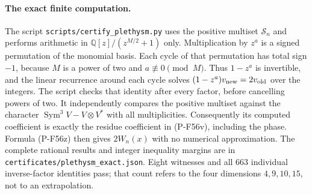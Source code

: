 \paragraph{The exact finite computation.}
The script \texttt{scripts/certify\_plethysm.py} uses the positive
multiset $\mathcal S_n$ and performs arithmetic in
$\mathbb Q[z]/(z^{M/2}+1)$ only.  Multiplication by $z^a$ is a
signed permutation of the monomial basis.  Each cycle of that
permutation has total sign $-1$, because $M$ is a power of two
and $a\not\equiv0\pmod M$.  Thus $1-z^a$ is invertible, and the
linear recurrence around each cycle solves
$(1-z^a)v_{\rm new}=2v_{\rm old}$ over the integers.
The script checks that identity after every factor, before
cancelling powers of two.  It independently compares the positive
multiset against the character
$\operatorname{Sym}^3V-V\otimes V^*$ with all multiplicities.
Consequently its computed coefficient is exactly the residue
coefficient in (P-F56v), including the phase.  Formula (P-F56z)
then gives $2W_n(x)$ with no numerical approximation.
The complete rational results and integer inequality margins are
in \texttt{certificates/plethysm\_exact.json}.  Eight witnesses and
all 663 individual inverse-factor identities pass; that count
refers to the four dimensions $4,9,10,15$, not to an extrapolation.

